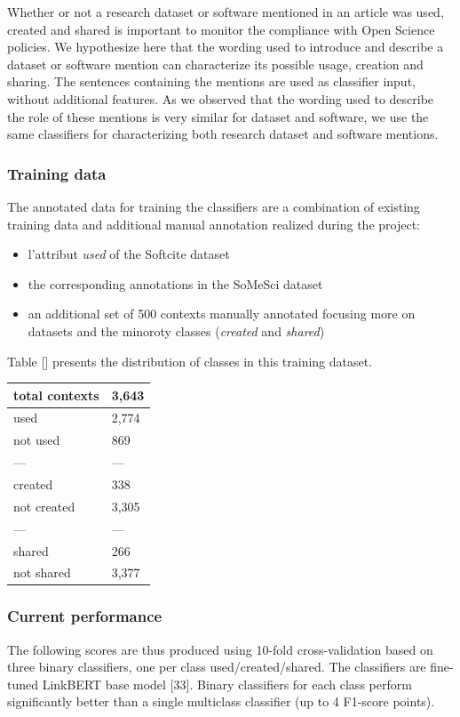 \documentclass[
]{article}
\begin{document}
Whether or not a research dataset or software mentioned in an article
was used, created and shared is important to monitor the compliance with
Open Science policies. We hypothesize here that the wording used to
introduce and describe a dataset or software mention can characterize
its possible usage, creation and sharing. The sentences containing the
mentions are used as classifier input, without additional features. As
we observed that the wording used to describe the role of these mentions
is very similar for dataset and software, we use the same classifiers
for characterizing both research dataset and software mentions.

\hypertarget{training-data}{%
\subsubsection{Training data}\label{training-data}}

The annotated data for training the classifiers are a combination of
existing training data and additional manual annotation realized during
the project:

\begin{itemize}
\item
  l'attribut \emph{used} of the Softcite dataset
\item
  the corresponding annotations in the SoMeSci dataset
\item
  an additional set of 500 contexts manually annotated focusing more on
  datasets and the minoroty classes (\emph{created} and \emph{shared})
\end{itemize}

Table {[}{]} presents the distribution of classes in this training
dataset.

\begin{longtable}[]{@{}ll@{}}
\toprule
total contexts & 3,643\tabularnewline
\midrule
\endhead
used & 2,774\tabularnewline
not used & 869\tabularnewline
--- & ---\tabularnewline
created & 338\tabularnewline
not created & 3,305\tabularnewline
--- & ---\tabularnewline
shared & 266\tabularnewline
not shared & 3,377\tabularnewline
\bottomrule
\end{longtable}

\hypertarget{current-performance-1}{%
\subsubsection{Current performance}\label{current-performance-1}}

The following scores are thus produced using 10-fold cross-validation
based on three binary classifiers, one per class used/created/shared.
The classifiers are fine-tuned LinkBERT base model {[}33{]}. Binary
classifiers for each class perform significantly better than a single
multiclass classifier (up to 4 F1-score points).
\end{document}
